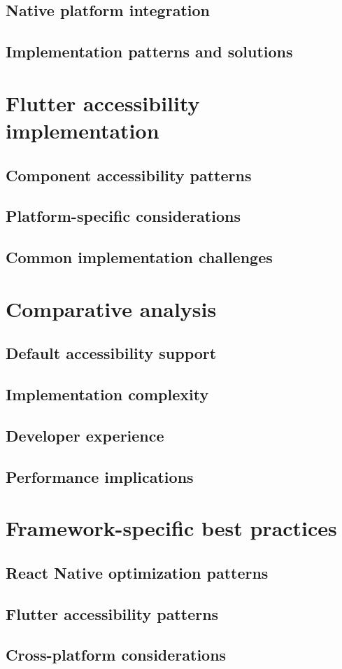 \subsection {Native platform integration}
\subsection {Implementation patterns and solutions}

\section {Flutter accessibility implementation}

\subsection {Component accessibility patterns}
\subsection {Platform-specific considerations}
\subsection {Common implementation challenges}

\section {Comparative analysis}

\subsection {Default accessibility support}
\subsection {Implementation complexity}
\subsection {Developer experience}
\subsection {Performance implications}

\section {Framework-specific best practices}

\subsection{React Native optimization patterns}
\subsection{Flutter accessibility patterns}
\subsection{Cross-platform considerations}

\newpage